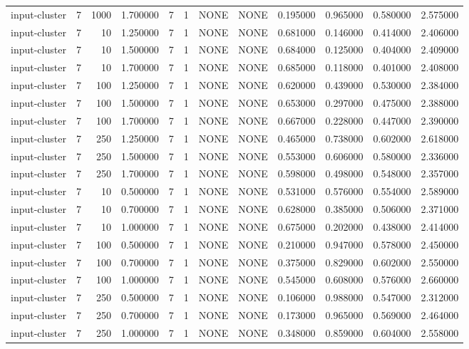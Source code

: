 \begin{tabular}{lrrrllllrrrr}
input-cluster & 7 & 1000 & 1.700000 & 7 & 1 & NONE & NONE & 0.195000 & 0.965000 & 0.580000 & 2.575000 \\
input-cluster & 7 & 10 & 1.250000 & 7 & 1 & NONE & NONE & 0.681000 & 0.146000 & 0.414000 & 2.406000 \\
input-cluster & 7 & 10 & 1.500000 & 7 & 1 & NONE & NONE & 0.684000 & 0.125000 & 0.404000 & 2.409000 \\
input-cluster & 7 & 10 & 1.700000 & 7 & 1 & NONE & NONE & 0.685000 & 0.118000 & 0.401000 & 2.408000 \\
input-cluster & 7 & 100 & 1.250000 & 7 & 1 & NONE & NONE & 0.620000 & 0.439000 & 0.530000 & 2.384000 \\
input-cluster & 7 & 100 & 1.500000 & 7 & 1 & NONE & NONE & 0.653000 & 0.297000 & 0.475000 & 2.388000 \\
input-cluster & 7 & 100 & 1.700000 & 7 & 1 & NONE & NONE & 0.667000 & 0.228000 & 0.447000 & 2.390000 \\
input-cluster & 7 & 250 & 1.250000 & 7 & 1 & NONE & NONE & 0.465000 & 0.738000 & 0.602000 & 2.618000 \\
input-cluster & 7 & 250 & 1.500000 & 7 & 1 & NONE & NONE & 0.553000 & 0.606000 & 0.580000 & 2.336000 \\
input-cluster & 7 & 250 & 1.700000 & 7 & 1 & NONE & NONE & 0.598000 & 0.498000 & 0.548000 & 2.357000 \\
input-cluster & 7 & 10 & 0.500000 & 7 & 1 & NONE & NONE & 0.531000 & 0.576000 & 0.554000 & 2.589000 \\
input-cluster & 7 & 10 & 0.700000 & 7 & 1 & NONE & NONE & 0.628000 & 0.385000 & 0.506000 & 2.371000 \\
input-cluster & 7 & 10 & 1.000000 & 7 & 1 & NONE & NONE & 0.675000 & 0.202000 & 0.438000 & 2.414000 \\
input-cluster & 7 & 100 & 0.500000 & 7 & 1 & NONE & NONE & 0.210000 & 0.947000 & 0.578000 & 2.450000 \\
input-cluster & 7 & 100 & 0.700000 & 7 & 1 & NONE & NONE & 0.375000 & 0.829000 & 0.602000 & 2.550000 \\
input-cluster & 7 & 100 & 1.000000 & 7 & 1 & NONE & NONE & 0.545000 & 0.608000 & 0.576000 & 2.660000 \\
input-cluster & 7 & 250 & 0.500000 & 7 & 1 & NONE & NONE & 0.106000 & 0.988000 & 0.547000 & 2.312000 \\
input-cluster & 7 & 250 & 0.700000 & 7 & 1 & NONE & NONE & 0.173000 & 0.965000 & 0.569000 & 2.464000 \\
input-cluster & 7 & 250 & 1.000000 & 7 & 1 & NONE & NONE & 0.348000 & 0.859000 & 0.604000 & 2.558000 \\

\end{tabular}
